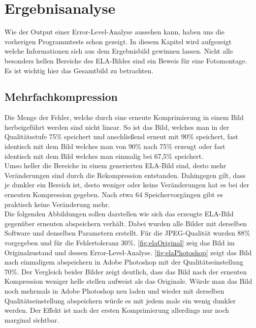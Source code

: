 \chapter{Ergebnisanalyse} \label{chap:ergebnisanalyse}
Wie der Output einer Error-Level-Analyse aussehen kann, haben uns die vorherigen Programmtests schon gezeigt. In diesem Kapitel wird aufgezeigt welche Informationen sich aus dem Ergebnisbild gewinnen lassen. Nicht alle besonders hellen Bereiche des ELA-Bildes sind ein Beweis für eine Fotomontage. Es ist wichtig hier das Gesamtbild zu betrachten.

\section{Mehrfachkompression} \label{chap:mehrfachkompression}
Die Menge der Fehler, welche durch eine erneute Komprimierung in einem Bild herbeigeführt werden sind nicht linear. So ist das Bild, welches man in der Qualitätsstufe 75\% speichert und anschließend erneut mit 90\% speichert, fast identisch mit dem Bild welches man von 90\% nach 75\% erzeugt oder fast identisch mit dem Bild welches man einmalig bei 67,5\% speichert.\cite{Krawetz2008}\\
Umso heller die Bereiche in einem generierten ELA-Bild sind, desto mehr Veränderungen sind durch die Rekompression entstanden. Dahingegen gilt, dass je dunkler ein Bereich ist, desto weniger oder keine Veränderungen hat es bei der erneuten Kompression gegeben. Nach etwa 64 Speichervorgängen gibt es praktisch keine Veränderung mehr.\\
Die folgenden Abbildungen sollen darstellen wie sich das erzeugte ELA-Bild gegenüber erneuten abspeichern verhält. Dabei wurden alle Bilder mit derselben Software und denselben Parametern erstellt. Für die JPEG-Qualität wurden 88\% vorgegeben und für die Fehlertoleranz 30\%.
\autoref{fig:elaOriginal} zeig das Bild im Originalzustand und dessen Error-Level-Analyse. \autoref{fig:elaPhotoshop} zeigt das Bild nach einmaligem abspeichern in Adobe Photoshop mit der Qualitätseinstellung 70\%. Der Vergleich beider Bilder zeigt deutlich, dass das Bild nach der erneuten Kompression weniger helle stellen aufweist als das Originale. Würde man das Bild noch mehrmals in Adobe Photoshop neu laden und wieder mit derselben Qualitätseinstellung abspeichern würde es mit jedem male ein wenig dunkler werden. Der Effekt ist nach der ersten Komprimierung allerdings nur noch marginal sichtbar. 

